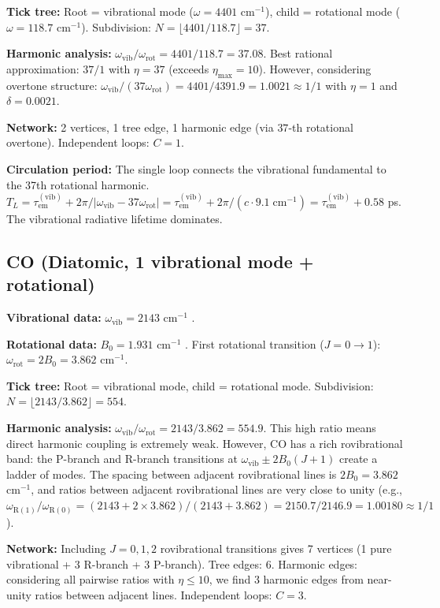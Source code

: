 \documentclass[11pt,a4paper]{article}
\theoremstyle{definition}
\theoremstyle{remark}
\newcommand{\tem}{\tau_{\mathrm{em}}}
\newcommand{\etamax}{\eta_{\mathrm{max}}}
\begin{document}
\textbf{Tick tree:} Root = vibrational mode ($\omega = 4401$ cm$^{-1}$), child = rotational mode ($\omega = 118.7$ cm$^{-1}$). Subdivision: $N = \lfloor 4401/118.7 \rfloor = 37$.

\textbf{Harmonic analysis:} $\omega_{\mathrm{vib}}/\omega_{\mathrm{rot}} = 4401/118.7 = 37.08$. Best rational approximation: $37/1$ with $\eta = 37$ (exceeds $\etamax = 10$). However, considering overtone structure: $\omega_{\mathrm{vib}}/(37 \omega_{\mathrm{rot}}) = 4401/4391.9 = 1.0021 \approx 1/1$ with $\eta = 1$ and $\delta = 0.0021$.

\textbf{Network:} 2 vertices, 1 tree edge, 1 harmonic edge (via $37$-th rotational overtone). Independent loops: $C = 1$.

\textbf{Circulation period:} The single loop connects the vibrational fundamental to the 37th rotational harmonic. $T_L = \tem^{(\mathrm{vib})} + 2\pi/|\omega_{\mathrm{vib}} - 37\omega_{\mathrm{rot}}| = \tem^{(\mathrm{vib})} + 2\pi/(c \cdot 9.1 \;\text{cm}^{-1}) = \tem^{(\mathrm{vib})} + 0.58$ ps. The vibrational radiative lifetime dominates.

\subsection{CO (Diatomic, 1 vibrational mode + rotational)}

\textbf{Vibrational data:} $\omega_{\mathrm{vib}} = 2143$ cm$^{-1}$ \citep{huber1979}.

\textbf{Rotational data:} $B_0 = 1.931$ cm$^{-1}$ \citep{huber1979}. First rotational transition ($J = 0 \to 1$): $\omega_{\mathrm{rot}} = 2B_0 = 3.862$ cm$^{-1}$.

\textbf{Tick tree:} Root = vibrational mode, child = rotational mode. Subdivision: $N = \lfloor 2143/3.862 \rfloor = 554$.

\textbf{Harmonic analysis:} $\omega_{\mathrm{vib}}/\omega_{\mathrm{rot}} = 2143/3.862 = 554.9$. This high ratio means direct harmonic coupling is extremely weak. However, CO has a rich rovibrational band: the P-branch and R-branch transitions at $\omega_{\mathrm{vib}} \pm 2B_0(J+1)$ create a ladder of modes. The spacing between adjacent rovibrational lines is $2B_0 = 3.862$ cm$^{-1}$, and ratios between adjacent rovibrational lines are very close to unity (e.g., $\omega_{\mathrm{R}(1)}/\omega_{\mathrm{R}(0)} = (2143 + 2 \times 3.862)/(2143 + 3.862) = 2150.7/2146.9 = 1.00180 \approx 1/1$).

\textbf{Network:} Including $J = 0, 1, 2$ rovibrational transitions gives 7 vertices (1 pure vibrational + 3 R-branch + 3 P-branch). Tree edges: 6. Harmonic edges: considering all pairwise ratios with $\eta \leq 10$, we find 3 harmonic edges from near-unity ratios between adjacent lines. Independent loops: $C = 3$.
\end{document}
